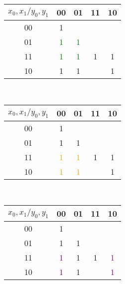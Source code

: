 \documentclass{article}
\begin{document}
    \centering
    \caption{\textcolor{green}{$x_1$ $\overline{y_0}$}=} 
    \begin{tabular}{|c|c|c|c|c|}
        \hline
        $x_0,x_1 / y_0,y_1$ & 00 & 01 & 11 & 10 \\
        \hline
        00 & 1&  & &  \\
        \hline
        01 & \textcolor{green}{1}  & \textcolor{green}{1} &  &  \\
        \hline
        11 & \textcolor{green}{1} & \textcolor{green}{1} & 1 & 1 \\
        \hline
        10 & 1 & 1 &  & 1 \\
        \hline
    \end{tabular}
    \ \\

    \centering
    \caption{\textcolor{orange}{$x_0$ $\overline{y_0}$}=} 
    \begin{tabular}{|c|c|c|c|c|}
        \hline
        $x_0,x_1 / y_0,y_1$ & 00 & 01 & 11 & 10 \\
        \hline
        00 & 1&  & &  \\
        \hline
        01 & 1 & 1&  &  \\
        \hline
        11 & \textcolor{orange}{1} & \textcolor{orange}{1} & 1 & 1 \\
        \hline
        10 & \textcolor{orange}{1} & \textcolor{orange}{1} &  & 1 \\
        \hline
    \end{tabular}
    \ \\

    \centering
    \caption{\textcolor{purple}{$x_0$ $\overline{y_1}$}=} 
    \begin{tabular}{|c|c|c|c|c|}
        \hline
        $x_0,x_1 / y_0,y_1$ & 00 & 01 & 11 & 10 \\
        \hline
        00 & 1&  & &  \\
        \hline
        01 & 1 & 1&  &  \\
        \hline
        11 & \textcolor{purple}{1} & 1 & 1 & \textcolor{purple}{1} \\
        \hline
        10 & \textcolor{purple}{1} & 1 &  & \textcolor{purple}{1} \\
        \hline
    \end{tabular}
    \ \\
\end{document}
